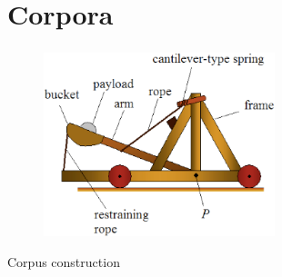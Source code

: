 \documentclass[xcolor=dvipsnames]{beamer}
\begin{document}
\section{Corpora}
{
\begin{frame}
	\frametitle{\insertsection}
	
	\vskip 0.8cm
	
	\begin{figure}[l]
     \includegraphics[width=0.60\textwidth]{Pictures/throw_over_the_wall2} \hspace{4cm}
	\end{figure}
	\begin{center}
	{\large Corpus construction}
	\end{center}
\end{frame}
}
\end{document}
